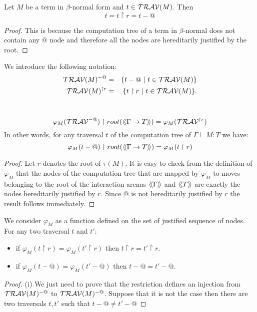 \begin{lem}
Let $M$ be a term in $\beta$-normal form and $t \in
\mathcal{TRAV}(M)$. Then
$$t = t \upharpoonright r = t - @$$
\end{lem}
\begin{proof}
This is because the computation tree of a term in $\beta$-normal
does not contain any $@$ node and therefore all the nodes are
hereditarily justified by the root.
\end{proof}


We introduce the following notation:
\begin{eqnarray*}
\mathcal{TRAV}(M)^{-@} &=& \{ t - @ \ | \  t \in \mathcal{TRAV}(M) \} \\
\mathcal{TRAV}(M)^{\upharpoonright r} &=& \{ t  \upharpoonright r \ | \  t  \in \mathcal{TRAV}(M) \} .
\end{eqnarray*}


\begin{lem} \
\label{lem:varphi_filter}
$$ \varphi_M(\mathcal{TRAV}^{-@}) \upharpoonright root({\langle\!\langle \Gamma \rightarrow T \rangle\!\rangle}) = \varphi_M(\mathcal{TRAV}^{\upharpoonright r}) $$
In other words, for any traversal $t$ of the computation tree of $\Gamma \vdash M :T$ we have:
$$\varphi_M(t-@) \upharpoonright root({\langle\!\langle \Gamma \rightarrow T \rangle\!\rangle}) = \varphi_M(t\upharpoonright r)$$
\end{lem}
\begin{proof}
    Let $r$ denotes the root of $\tau(M)$.
    It is easy to check from the definition of $\varphi_M$ that the nodes of the computation tree that are mapped by $\varphi_M$
    to moves belonging to the root of the interaction arenas ${\langle\!\langle \Gamma \rangle\!\rangle}$ and ${\langle\!\langle T \rangle\!\rangle}$ are
    exactly the nodes hereditarily justified by $r$.
    Since $@$ is not hereditarily justified by $r$ the result follows immediately.
\end{proof}


\begin{lem}
We consider $\varphi_M$ as a function defined on the set of
justified sequence of nodes. For any two traversal $t$ and $t'$:
\begin{itemize}
\item[(i)] if $\varphi_M (t \upharpoonright r ) = \varphi_M (t' \upharpoonright r )$ then $t\upharpoonright r = t'\upharpoonright r$.
\item[(ii)] if $\varphi_M (t - @ ) = \varphi_M (t' - @ )$ then $t-@ =t' -@$.
\end{itemize}
\end{lem}
\begin{proof}
(i) We just need to prove that the restriction defines an injection
from $\mathcal{TRAV}(M)^{-@}$ to $\mathcal{TRAV}(M)^{-@}$. Suppose
that it is not the case then there are two traversals $t,t'$ such
that $t-@ \neq t'-@$


\end{proof}

